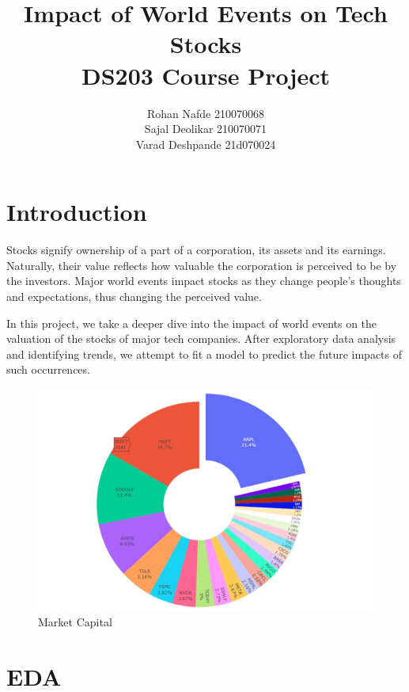 \documentclass[11pt, twocolumn]{article}
\title{
Impact of World Events on Tech Stocks \\
DS203 Course Project
}
\author{Rohan Nafde 210070068\\
Sajal Deolikar 210070071\\
Varad Deshpande 21d070024}
\date{}
\begin{document}
\maketitle

\begin{justify}

\section*{\huge Introduction}\label{sec:intro}

\vspace{-5pt}

Stocks signify ownership of a part of a corporation, its assets and its earnings.
Naturally, their value reflects how valuable the corporation is perceived to be by the investors.
Major world events impact stocks as they change people's thoughts and expectations, thus changing 
the perceived value.
\vspace{1em}

In this project, we take a deeper dive into the impact of world events on the valuation of the stocks
of major tech companies. After exploratory data analysis and identifying trends, we attempt to fit a 
model to predict the future impacts of such occurrences.

\begin{figure}[h]
  \centering
  \includegraphics[scale=0.4]{figs/pie.jpg}
  \caption*{Market Capital}
\end{figure}

\section{\huge EDA}\label{sec:eda}


\end{justify}
\end{document}
